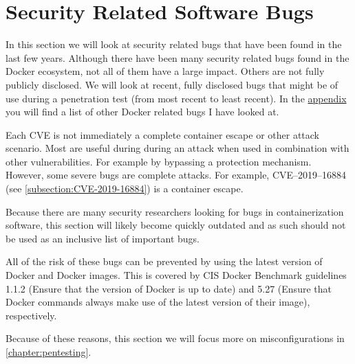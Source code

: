 \section{Security Related Software Bugs}\label{section:bugs}
In this section we will look at security related bugs that have been found in the last few years. Although there have been many security related bugs found in the Docker ecosystem, not all of them have a large impact. Others are not fully publicly disclosed. We will look at recent, fully disclosed bugs that might be of use during a penetration test (from most recent to least recent). In the \hyperref[appendix:CVE-List]{appendix} you will find a list of other Docker related bugs I have looked at.

Each CVE is not immediately a complete container escape or other attack scenario. Most are useful during during an attack when used in combination with other vulnerabilities. For example by bypassing a protection mechanism.
However, some severe bugs are complete attacks. For example, CVE--2019--16884 (see \autoref{subsection:CVE-2019-16884}) is a container escape.

\medskip

Because there are many security researchers looking for bugs in containerization software, this section will likely become quickly outdated and as such should not be used as an inclusive list of important bugs.

All of the risk of these bugs can be prevented by using the latest version of Docker and Docker images. This is covered by CIS Docker Benchmark guidelines 1.1.2 (Ensure that the version of Docker is up to date) and 5.27 (Ensure that Docker commands always make use of the latest version of their image), respectively.

Because of these reasons, this section we will focus more on misconfigurations in \autoref{chapter:pentesting}.








